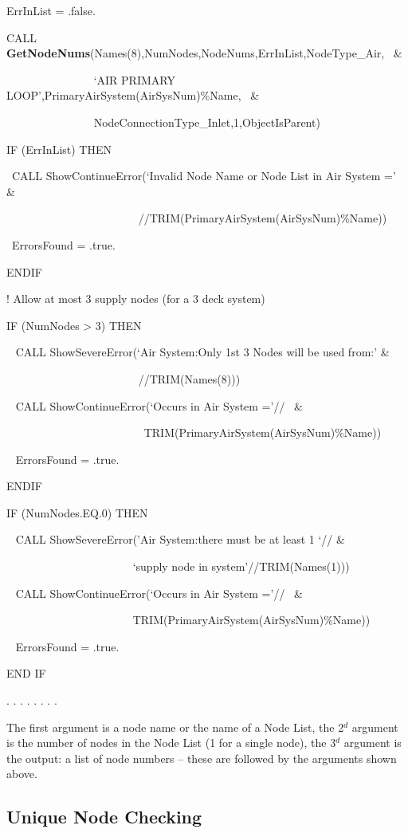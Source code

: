 ErrInList = .false.

CALL \textbf{GetNodeNums}(Names(8),NumNodes,NodeNums,ErrInList,NodeType\_Air,~ \&

~~~~~~~~~~~~~~~ `AIR PRIMARY LOOP',PrimaryAirSystem(AirSysNum)\%Name,~ \&

~~~~~~~~~~~~~~~ NodeConnectionType\_Inlet,1,ObjectIsParent)

IF (ErrInList) THEN

~CALL ShowContinueError(`Invalid Node Name or Node List in Air System =' \&

~~~~~~~~~~~~~~~~~~~~~~~ //TRIM(PrimaryAirSystem(AirSysNum)\%Name))

~ErrorsFound = .true.

ENDIF

! Allow at most 3 supply nodes (for a 3 deck system)

IF (NumNodes \textgreater{} 3) THEN

~ CALL ShowSevereError(`Air System:Only 1st 3 Nodes will be used from:' \&

~~~~~~~~~~~~~ ~~~~~~~~~~//TRIM(Names(8)))

~ CALL ShowContinueError(`Occurs in Air System ='//~ \&

~~~~~~~~~~~~~~~~~~~~~~~~ TRIM(PrimaryAirSystem(AirSysNum)\%Name))

~ ErrorsFound = .true.

ENDIF

IF (NumNodes.EQ.0) THEN

~ CALL ShowSevereError('Air System:there must be at least 1 `// \&

~~~~~~~~~~~~~~~~~~~~~~ `supply node in system'//TRIM(Names(1)))

~ CALL ShowContinueError(`Occurs in Air System ='//~ \&

~~~~~~~~~~~~~~~~~~~~~~ TRIM(PrimaryAirSystem(AirSysNum)\%Name))

~ ErrorsFound = .true.

END IF

. . . . . . . .

The first argument is a node name or the name of a Node List, the 2\(^{d}\) argument is the number of nodes in the Node List (1 for a single node), the 3\(^{d}\) argument is the output: a list of node numbers -- these are followed by the arguments shown above.

\subsection{Unique Node Checking}\label{unique-node-checking}

